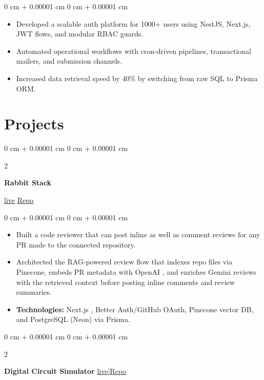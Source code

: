 \documentclass[10pt, letterpaper]{article}
\newenvironment{highlights}{
    \begin{itemize}[
        topsep=0.10 cm,
        parsep=0.10 cm,
        partopsep=0pt,
        itemsep=0pt,
        leftmargin=0 cm + 10pt
    ]
}{
    \end{itemize}
}
\newenvironment{onecolentry}{
    \begin{adjustwidth}{
        0 cm + 0.00001 cm
    }{
        0 cm + 0.00001 cm
    }
}{
    \end{adjustwidth}
}
\newenvironment{twocolentry}[2][]{
    \onecolentry
    \def\secondColumn{#2}
    \setcolumnwidth{\fill, 4.5 cm}
    \begin{paracol}{2}
}{
    \switchcolumn \raggedleft \secondColumn
    \end{paracol}
    \endonecolentry
}
\begin{document}
        \vspace{0.10 cm}
        \begin{onecolentry}
            \begin{highlights}
                \item Developed a scalable auth platform for 1000+ users using NestJS, Next.js, JWT flows, and modular RBAC guards.
                \item Automated operational workflows with cron-driven pipelines, transactional mailers, and submission channels.
                \item Increased data retrieval speed by 40\% by switching from raw SQL to Prisma ORM.
            \end{highlights}
        \end{onecolentry}

\section{Projects}
        
\begin{twocolentry}{
    \href{https://rabbit-stack.vercel.app/}{live} \AND 
    \href{https://github.com/utk2602/rabbit-stack}{Repo}
}
    \textbf{Rabbit Stack}
\end{twocolentry}

\vspace{0.10 cm}
\begin{onecolentry}
    \begin{highlights}
        \item Built a code reviewer that can post inline as well as comment reviews for any PR made to the connected repository.
        \item Architected the RAG-powered review flow that indexes repo files via Pinecone, embeds PR metadata with OpenAI , and enriches Gemini reviews  with the retrieved context before posting inline comments and review summaries.
        \item \textbf{Technologies:} Next.js , Better Auth/GitHub OAuth, Pinecone vector DB, and PostgreSQL (Neon) via Prisma.
    \end{highlights}
\end{onecolentry}


        \vspace{0.2 cm}

\begin{twocolentry}{
            \href{https://circuitsim.acmvit.in/}{live}|\href{https://github.com/utk2602/Digital-Circuit-Simulator}{Repo}
        }
            \textbf{Digital Circuit Simulator }\end{twocolentry}
\end{document}
